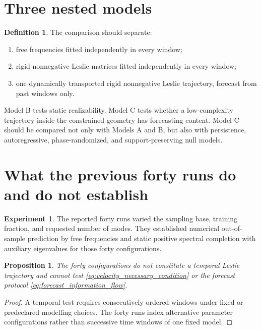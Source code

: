 \documentclass[11pt]{amsart}
\numberwithin{equation}{section}
\theoremstyle{plain}
\newtheorem{proposition}[theorem]{Proposition}
\theoremstyle{definition}
\newtheorem{definition}[theorem]{Definition}
\newtheorem{experiment}[theorem]{Experiment}
\theoremstyle{remark}
\begin{document}
\section{Three nested models}
\label{sec:nested_models}

\begin{definition}
\label{def:models_abc}
The comparison should separate:
\begin{enumerate}
\item free frequencies fitted independently in every window;
\item rigid nonnegative Leslie matrices fitted independently in every window;
\item one dynamically transported rigid nonnegative Leslie trajectory, forecast from past windows only.
\end{enumerate}
\end{definition}

Model B tests static realizability.  Model C tests whether a low-complexity trajectory inside the constrained geometry has forecasting content.  Model C should be compared not only with Models A and B, but also with persistence, autoregressive, phase-randomized, and support-preserving null models.

\section{What the previous forty runs do and do not establish}
\label{sec:forty_runs}

\begin{experiment}
\label{exp:previous_runs}
The reported forty runs varied the sampling base, training fraction, and requested number of modes.  They established numerical out-of-sample prediction by free frequencies and static positive spectral completion with auxiliary eigenvalues for those forty configurations.
\end{experiment}

\begin{proposition}
\label{prop:runs_not_trajectory}
The forty configurations do not constitute a temporal Leslie trajectory and cannot test \eqref{eq:velocity_necessary_condition} or the forecast protocol \eqref{eq:forecast_information_flow}.
\end{proposition}

\begin{proof}
A temporal test requires consecutively ordered windows under fixed or predeclared modelling choices.  The forty runs index alternative parameter configurations rather than successive time windows of one fixed model.
\end{proof}
\end{document}

